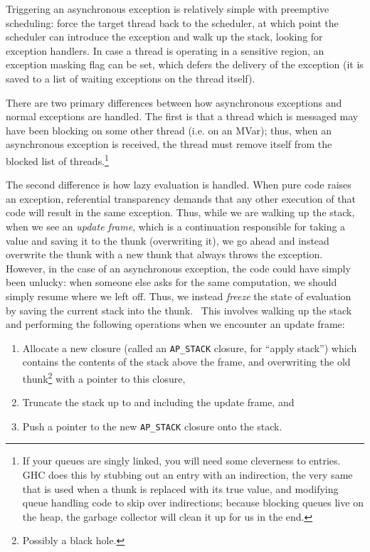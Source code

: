 Triggering an asynchronous exception is relatively simple with
preemptive scheduling: force the target thread back to the scheduler,
at which point the scheduler can introduce the exception and walk up the
stack, looking for exception handlers.  In
case a thread is operating in a sensitive region, an exception masking
flag can be set, which defers the delivery of the exception (it is saved
to a list of waiting exceptions on the thread itself).

There are two primary differences between how asynchronous exceptions
and normal exceptions are handled.  The first is that a thread which is
messaged may have been blocking on some other thread (i.e. on an MVar);
thus, when an asynchronous exception is received, the thread must remove
itself from the blocked list of threads.\footnote{If your queues are
    singly linked, you will need some cleverness to entries. GHC does
    this by stubbing out an entry with an indirection, the very same
that is used when a thunk is replaced with its true value, and modifying
queue handling code to skip over indirections; because blocking queues
live on the heap, the garbage collector will clean it up for us in the end.}


The second difference is how lazy evaluation is handled. When pure code
raises an exception, referential transparency demands that any other
execution of that code will result in the same exception.  Thus, while
we are walking up the stack, when we see an \emph{update frame}, which
is a continuation responsible for taking a value and saving it to the
thunk (overwriting it), we go ahead and instead overwrite the thunk with a new
thunk that always throws the exception.  However, in the case of an
asynchronous exception, the code could have simply been unlucky: when
someone else asks for the same computation, we should simply resume
where we left off.  Thus, we instead \emph{freeze} the state of
evaluation by saving the current stack into the thunk.~\cite{Reid1999}
This involves walking up the stack and performing the following
operations when we encounter an update frame:

\begin{enumerate}
    \item Allocate a new closure (called an \verb|AP_STACK| closure, for
        ``apply stack'') which contains the contents of the stack above
        the frame, and overwriting the old thunk\footnote{Possibly a
        black hole.} with a pointer to this closure,
    \item Truncate the stack up to and including the update frame, and
    \item Push a pointer to the new \verb|AP_STACK| closure onto the stack.
\end{enumerate}

